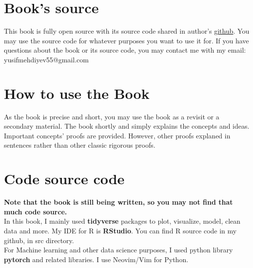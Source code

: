 \section*{Book's source}
This book is fully open source with its source code shared in author's \href{https://github.com/JosephMehdiyev}{github}. You may use the source code for whatever purposes you want to use it for. If you have questions about the book or its source code, you may contact me with my email: yusifmehdiyev55@gmail.com 
\section*{How to use the Book}
As the book is precise and short, you may use the book as a revisit or a secondary material. The book shortly and simply explains the concepts and ideas. Important concepts' proofs are provided. However, other proofs explaned in sentences rather than other classic rigorous proofs.

\section*{Code source code}
\textbf{Note that the book is still being written, so you may not find that much code source.}\\
In this book, I mainly used \textbf{tidyverse} packages to plot, visualize, model, clean data and more. My IDE for R is \textbf{RStudio}. You can find R source code in my github, in src directory.
\\
For Machine learning and other data science purposes, I used python library \textbf{pytorch} and related libraries. I use Neovim/Vim for Python.
